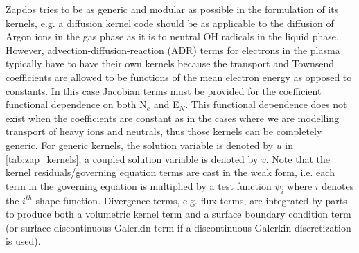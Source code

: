 Zapdos tries to be as generic and modular as possible in the formulation of its kernels, e.g. a diffusion kernel code should be as applicable to the diffusion of Argon ions in the gas phase as it is to neutral OH radicals in the liquid phase. However, advection-diffusion-reaction (ADR) terms for electrons in the plasma typically have to have their own kernels because the transport and Townsend coefficients are allowed to be functions of the mean electron energy as opposed to constants. In this case Jacobian terms must be provided for the coefficient functional dependence on both N$_e$ and E$_N$. This functional dependence does not exist when the coefficients are constant as in the cases where we are modelling transport of heavy ions and neutrals, thus those kernels can be completely generic. For generic kernels, the solution variable is denoted by $u$ in \cref{tab:zap_kernels}; a coupled solution variable is denoted by $v$. Note that the kernel residuals/governing equation terms are cast in the weak form, i.e. each term in the governing equation is multiplied by a test function $\psi_i$ where $i$ denotes the $i^{th}$ shape function. Divergence terms, e.g. flux terms, are integrated by parts to produce both a volumetric kernel term and a surface boundary condition term (or surface discontinuous Galerkin term if a discontinuous Galerkin discretization is used).

